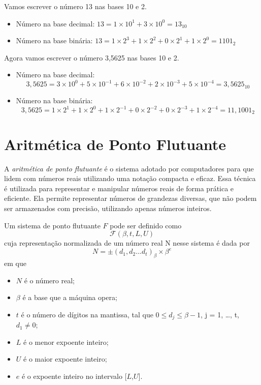 \begin{ex}
  Vamos escrever o número 13 nas bases 10 e 2.
  \begin{itemize}
    \item Número na base decimal: $ 13 = 1 \times 10^1 + 3 \times 10^0 = 13_{10}$
    \item Número na base binária: $ 13 = 1 \times 2^3 + 1 \times 2^2 + 0 \times 2^1 + 1
            \times 2^0 = 1101_2$
  \end{itemize}
\end{ex}

\begin{ex}
  Agora vamos escrever o número 3,5625 nas bases 10 e 2.

  \begin{itemize}
    \item Número na base decimal:
          \[
            3{,}5625 = 3 \times 10^0 + 5 \times 10^{-1} + 6 \times 10^{-2} + 2 \times 10^{-3} + 5 \times 10^{-4} = 3{,}5625_{10}
          \]

    \item Número na base binária:
          \[
            3{,}5625 = 1\times 2^{1} + 1 \times 2^0 + 1 \times 2^{-1} + 0 \times 2^{-2} + 0 \times 2^{-3} + 1 \times 2^{-4} = 11{,}1001_2
          \]
  \end{itemize}
\end{ex}

\section{Aritmética de Ponto Flutuante}

A \textit{aritmética de ponto flutuante} é o sistema adotado por computadores
para que lidem com números reais utilizando uma notação compacta e eficaz. Essa
técnica é utilizada para representar e manipular números reais de forma prática
e eficiente. Ela permite representar números de grandezas diversas, que não
podem ser armazenados com precisão, utilizando apenas números inteiros.

Um sistema de ponto flutuante $F$ pode ser definido como
\[
  \mathcal{F}(\beta, t, L, U)\]
cuja representação normalizada de um número real N nesse sistema é dada por
\begin{equation}
  \label{eq:normalizedfp}
  N = \pm (d_{1},d_{2} . . . d_{t})_{\beta} \times \beta^e
\end{equation}
em que
\begin{itemize}
  \item \( N \) é o número real;
  \item \(\beta\) é a base que a máquina opera;
  \item \( t \) é o número de dígitos na mantissa, tal que \( 0 \leq d_{j} \leq \beta-1 \), j = 1, \ldots, t, \(d_{1} \neq 0\);
  \item \( L \) é o menor expoente inteiro;
  \item \( U \) é o maior expoente inteiro;
  \item \( e \) é o expoente inteiro no intervalo [\( L \),\( U \)].
\end{itemize}

